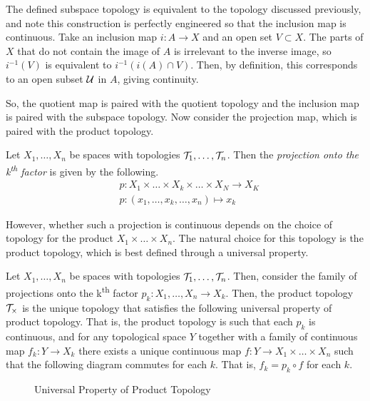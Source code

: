 \documentclass[../sean_thesis.tex]{subfiles}
\begin{document}
The defined subspace topology is equivalent to the topology discussed previously, and note this construction is perfectly engineered so that the inclusion map is continuous. Take an inclusion map $i: A \to X$ and an open set $V \subset X$. The parts of $X$ that do not contain the image of $A$ is irrelevant to the inverse image, so $i^{-1}(V)$ is equivalent to $i^{-1}(i(A) \cap V)$. Then, by definition, this corresponds to an open subset $\mathcal{U}$ in $A$, giving continuity.


So, the quotient map is paired with the quotient topology and the inclusion map is paired with the subspace topology. Now consider the projection map, which is paired with the product topology.
\begin{definition}[Projection] Let $X_1, \dots, X_n$ be spaces with topologies $\mathcal{T}_1, \dots, \mathcal{T}_n$. Then the \emph{projection onto the k\textsuperscript{th} factor} is given by the following.
	\begin{align*}
	&p: X_1 \times \dots \times X_k \times \dots \times X_N \to X_K\\
	&p: (x_1, \dots, x_k, \dots, x_n) \mapsto x_k
	\end{align*}
\end{definition}
However, whether such a projection is continuous depends on the choice of topology for the product $X_1 \times \dots \times X_n$. The natural choice for this topology is the product topology, which is best defined through a universal property.

\begin{definition}
Let $X_1, \dots, X_n$ be spaces with topologies $\mathcal{T}_1, \dots, \mathcal{T}_n$. Then, consider the family of projections onto the k\textsuperscript{th} factor $p_k: X_1, \dots, X_n \to X_k$. Then, the product topology $\mathcal{T}_\times$ is the unique topology that satisfies the following universal property of product topology. That is, the product topology is such that each $p_k$ is continuous, and for any topological space $Y$ together with a family of continuous map $f_k: Y \to X_k$ there exists a unique continuous map $f: Y \to X_1 \times \dots \times X_n$ such that the following diagram commutes for each $k$. That is, $f_k = p_k \circ f$ for each $k$. 

\begin{figure}[ht!]

\caption{Universal Property of Product Topology}
\label{fig:prod_top_univ_prop}
\end{figure}
\end{definition}
\end{document}
